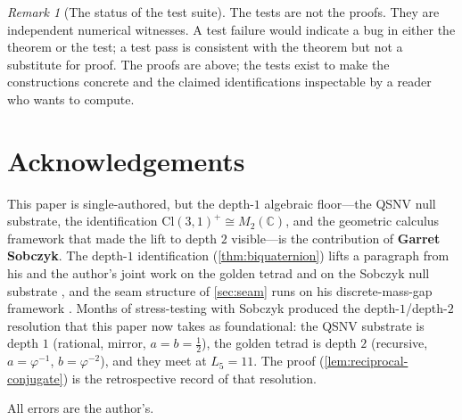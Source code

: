 \documentclass[11pt,a4paper]{article}
\theoremstyle{plain}
\theoremstyle{definition}
\theoremstyle{remark}
\newtheorem{remark}[theorem]{Remark}
\numberwithin{equation}{section}
\providecommand{\Cl}{\mathrm{Cl}}
\providecommand{\C}{\mathbb{C}}
\providecommand{\vp}{\varphi}
\providecommand{\half}{\tfrac{1}{2}}
\providecommand{\Lk}{L}
\begin{document}
\begin{remark}[The status of the test suite]
The tests are not the proofs.  They are independent numerical
witnesses.  A test failure would indicate a bug in either the
theorem or the test; a test pass is consistent with the theorem
but not a substitute for proof.  The proofs are above; the tests
exist to make the constructions concrete and the claimed
identifications inspectable by a reader who wants to compute.
\end{remark}

\section*{Acknowledgements}

This paper is single-authored, but the depth-$1$ algebraic
floor---the QSNV null substrate, the identification
$\Cl(3,1)^+ \cong M_2(\C)$, and the geometric calculus framework
that made the lift to depth $2$ visible---is the contribution of
\textbf{Garret Sobczyk}.  The depth-$1$ identification
(\cref{thm:biquaternion}) lifts a paragraph from his and the
author's joint work on the golden tetrad and on the Sobczyk null
substrate \cite{sobczyk-qsnv,hestenes-sobczyk,golden-tetrad}, and
the seam structure of \cref{sec:seam} runs on his discrete-mass-gap
framework \cite{kg-paper}.  Months of stress-testing with Sobczyk
produced the depth-$1$/depth-$2$ resolution that this paper now
takes as foundational: the QSNV substrate is depth $1$ (rational,
mirror, $a = b = \half$), the golden tetrad is depth $2$ (recursive,
$a = \vp^{-1}$, $b = \vp^{-2}$), and they meet at $\Lk_5 = 11$.
The proof (\cref{lem:reciprocal-conjugate}) is the retrospective
record of that resolution.

All errors are the author's.
\end{document}
